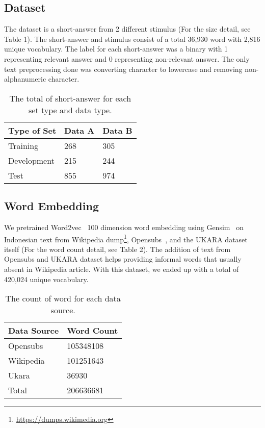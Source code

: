\documentclass[11pt,a4paper]{article}
\begin{document}
\subsection{Dataset}
The dataset is a short-answer from 2 different stimulus (For the size detail, see Table 1). The short-answer and stimulus consist of a total 36,930 word with 2,816 unique vocabulary. The label for each short-answer was a binary with 1 representing relevant answer and 0 representing non-relevant answer. The only text preprocessing done was converting character to lowercase and removing non-alphanumeric character.

\begin{table}
\centering
\small
\begin{tabular}{|l|l|l|}
\hline
\textbf{Type of Set} & \textbf{Data A} & \textbf{Data B}\\\hline
{Training} & {268} & {305} \\
{Development} & {215} & {244}  \\ 
{Test} & {855} & {974}  \\\hline
\end{tabular} 
\caption{The total of short-answer for each set type and data type.}
\end{table}

\subsection{Word Embedding}
We pretrained Word2vec~\cite{Word2vec} 100 dimension word embedding using Gensim~\cite{rehurek_lrec} on Indonesian text from Wikipedia dump\footnote{\url{https://dumps.wikimedia.org}}, Opensubs~\cite{opensubs}, and the UKARA dataset itself (For the word count detail, see Table 2). The addition of text from Opensubs and UKARA dataset helps providing informal words that usually absent in Wikipedia article. With this dataset, we ended up with a total of 420,024 unique vocabulary.

\begin{table}
\centering
\small
\begin{tabular}{|l|l|}
\hline
\textbf{Data Source} & \textbf{Word Count}\\\hline
{Opensubs} & {105348108}\\ 
{Wikipedia} & {101251643}\\
{Ukara} & {36930}\\ 
{Total} & {206636681}\\\hline
\end{tabular} 
\caption{The count of word for each data source.}
\end{table}
\end{document}
